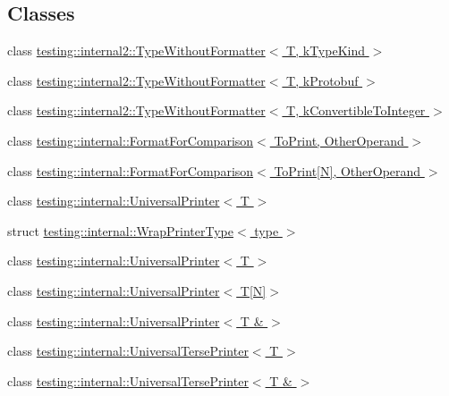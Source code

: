 \subsection*{Classes}
\begin{DoxyCompactItemize}
\item 
class \hyperlink{classtesting_1_1internal2_1_1TypeWithoutFormatter}{testing\+::internal2\+::\+Type\+Without\+Formatter$<$ T, k\+Type\+Kind $>$}
\item 
class \hyperlink{classtesting_1_1internal2_1_1TypeWithoutFormatter_3_01T_00_01kProtobuf_01_4}{testing\+::internal2\+::\+Type\+Without\+Formatter$<$ T, k\+Protobuf $>$}
\item 
class \hyperlink{classtesting_1_1internal2_1_1TypeWithoutFormatter_3_01T_00_01kConvertibleToInteger_01_4}{testing\+::internal2\+::\+Type\+Without\+Formatter$<$ T, k\+Convertible\+To\+Integer $>$}
\item 
class \hyperlink{classtesting_1_1internal_1_1FormatForComparison}{testing\+::internal\+::\+Format\+For\+Comparison$<$ To\+Print, Other\+Operand $>$}
\item 
class \hyperlink{classtesting_1_1internal_1_1FormatForComparison_3_01ToPrint[N]_00_01OtherOperand_01_4}{testing\+::internal\+::\+Format\+For\+Comparison$<$ To\+Print\mbox{[}\+N\mbox{]}, Other\+Operand $>$}
\item 
class \hyperlink{classtesting_1_1internal_1_1UniversalPrinter}{testing\+::internal\+::\+Universal\+Printer$<$ T $>$}
\item 
struct \hyperlink{structtesting_1_1internal_1_1WrapPrinterType}{testing\+::internal\+::\+Wrap\+Printer\+Type$<$ type $>$}
\item 
class \hyperlink{classtesting_1_1internal_1_1UniversalPrinter}{testing\+::internal\+::\+Universal\+Printer$<$ T $>$}
\item 
class \hyperlink{classtesting_1_1internal_1_1UniversalPrinter_3_01T[N]_4}{testing\+::internal\+::\+Universal\+Printer$<$ T\mbox{[}\+N\mbox{]}$>$}
\item 
class \hyperlink{classtesting_1_1internal_1_1UniversalPrinter_3_01T_01_6_01_4}{testing\+::internal\+::\+Universal\+Printer$<$ T \& $>$}
\item 
class \hyperlink{classtesting_1_1internal_1_1UniversalTersePrinter}{testing\+::internal\+::\+Universal\+Terse\+Printer$<$ T $>$}
\item 
class \hyperlink{classtesting_1_1internal_1_1UniversalTersePrinter_3_01T_01_6_01_4}{testing\+::internal\+::\+Universal\+Terse\+Printer$<$ T \& $>$}
\item 

\end{DoxyCompactItemize}
